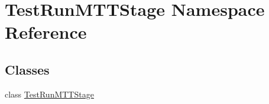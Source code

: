 \hypertarget{namespace_test_run_m_t_t_stage}{\section{Test\-Run\-M\-T\-T\-Stage Namespace Reference}
\label{namespace_test_run_m_t_t_stage}
}
\subsection*{Classes}
\begin{DoxyCompactItemize}
\item 
class \hyperlink{class_test_run_m_t_t_stage_1_1_test_run_m_t_t_stage}{Test\-Run\-M\-T\-T\-Stage}
\end{DoxyCompactItemize}
